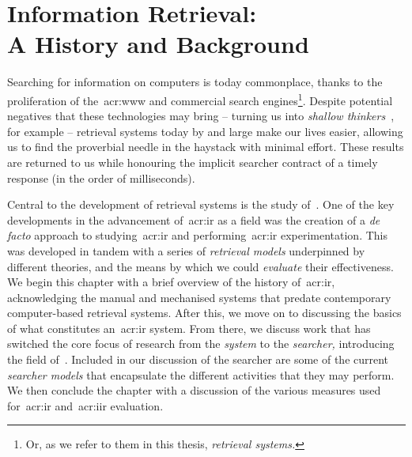 
\chapter[Information Retrieval]{Information Retrieval:\\A History and Background}\label{chap:ir_background}

Searching for information on computers is today commonplace, thanks to the proliferation of the~\gls{acr:www} and commercial search engines\footnote{Or, as we refer to them in this thesis, \emph{retrieval systems.}}. Despite potential negatives that these technologies may bring -- turning us into \emph{shallow thinkers}~\citep{carr2008google_stupid}, for example -- retrieval systems today by and large make our lives easier, allowing us to find the proverbial needle in the haystack with minimal effort. These results are returned to us while honouring the implicit searcher contract of a timely response (in the order of milliseconds).

\begin{figure}[h]
    \centering
    \vspace{4mm}
    \label{fig:searchbox}
    \vspace{-5mm}
\end{figure}

Central to the development of retrieval systems is the study of~. One of the key developments in the advancement of~\gls{acr:ir} as a field was the creation of a \emph{de facto} approach to studying~\gls{acr:ir} and performing~\gls{acr:ir} experimentation. This was developed in tandem with a series of \emph{retrieval models} underpinned by different theories, and the means by which we could \emph{evaluate} their effectiveness. We begin this chapter with a brief overview of the history of~\gls{acr:ir}, acknowledging the manual and mechanised systems that predate contemporary computer-based retrieval systems. After this, we move on to discussing the basics of what constitutes an~\gls{acr:ir} system. From there, we discuss work that has switched the core focus of research from the \emph{system} to the \emph{searcher,} introducing the field of~. Included in our discussion of the searcher are some of the current \emph{searcher models} that encapsulate the different activities that they may perform. We then conclude the chapter with a discussion of the various measures used for~\gls{acr:ir} and~\gls{acr:iir} evaluation.

